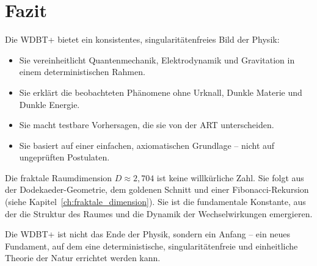 \section{Fazit}
\label{sec:fazit_zf}

Die WDBT+ bietet ein konsistentes, singularitätenfreies Bild der Physik:

\begin{itemize}
    \item Sie vereinheitlicht Quantenmechanik, Elektrodynamik und Gravitation in einem deterministischen Rahmen.
    \item Sie erklärt die beobachteten Phänomene ohne Urknall, Dunkle Materie und Dunkle Energie.
    \item Sie macht testbare Vorhersagen, die sie von der ART unterscheiden.
    \item Sie basiert auf einer einfachen, axiomatischen Grundlage – nicht auf ungeprüften Postulaten.
\end{itemize}

Die fraktale Raumdimension \( D \approx 2,704 \) ist keine willkürliche Zahl. Sie folgt aus der Dodekaeder-Geometrie, dem goldenen Schnitt und einer Fibonacci-Rekursion (siehe Kapitel~\ref{ch:fraktale_dimension}). Sie ist die fundamentale Konstante, aus der die Struktur des Raumes und die Dynamik der Wechselwirkungen emergieren.

Die WDBT+ ist nicht das Ende der Physik, sondern ein Anfang – ein neues Fundament, auf dem eine deterministische, singularitätenfreie und einheitliche Theorie der Natur errichtet werden kann.